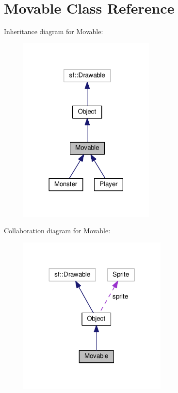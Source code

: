 \hypertarget{classMovable}{\section{Movable Class Reference}
\label{classMovable}
}


Inheritance diagram for Movable\+:
\nopagebreak
\begin{figure}[H]
\begin{center}
\leavevmode
\includegraphics[width=194pt]{classMovable__inherit__graph}
\end{center}
\end{figure}


Collaboration diagram for Movable\+:
\nopagebreak
\begin{figure}[H]
\begin{center}
\leavevmode
\includegraphics[width=212pt]{classMovable__coll__graph}
\end{center}
\end{figure}
